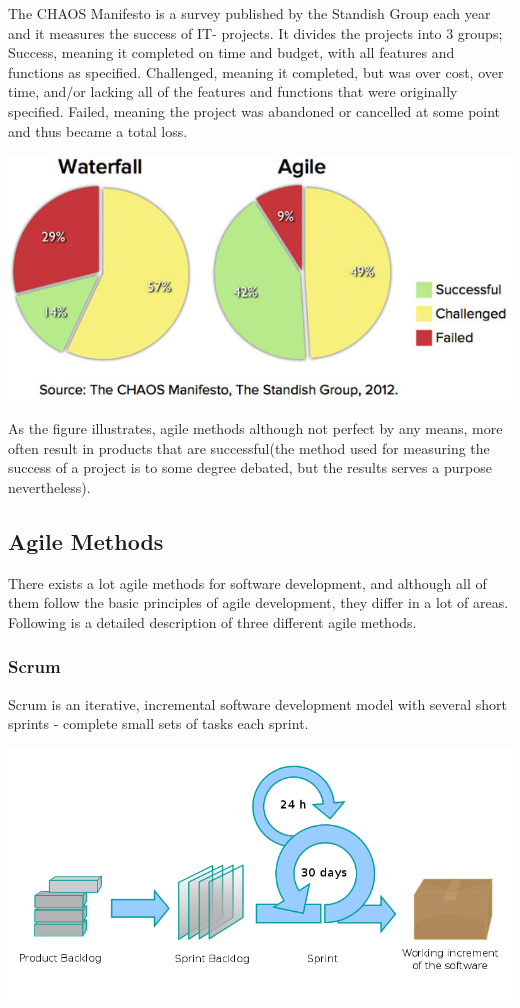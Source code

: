 The CHAOS Manifesto is a survey published by the Standish Group each year and it measures the success of IT- projects. It divides the projects into 3 groups; Success, meaning it completed on time and budget, with all features and functions as specified. Challenged, meaning it  completed, but was over cost, over time, and/or lacking all of the features and functions that were originally specified. Failed, meaning the project was abandoned or cancelled at some point and thus became a total loss.

\includegraphics[scale=0.3]{image/Agile-Waterfall.jpeg}

As the figure illustrates, agile methods although not perfect by any means, more often result in products that are successful(the method used for measuring the success of a project is to some degree debated, but the results serves a purpose nevertheless).

\subsection{Agile Methods}
There exists a lot agile methods for software development, and although all of them follow the basic principles of agile development, they differ in a lot of areas. Following is a detailed description of three different agile methods.

\subsubsection{Scrum}
Scrum is an iterative, incremental software development model with several short sprints - complete small sets of tasks each sprint.

\includegraphics[scale=0.3]{image/Scrum_process.png}

